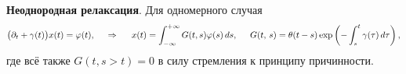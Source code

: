 \textbf{Неоднородная релаксация}. Для одномерного случая
\begin{equation*}
    \big(\partial_t + \gamma(t)\big) x(t) = \varphi(t),
    \hspace{0.5cm} \Rightarrow \hspace{0.5cm}
    x(t) = \int_{-\infty}^{+\infty}  G(t,s) \varphi(s) \, d s,
    \hspace{5 mm} 
    G(t,\,  s) = \theta(t-s) \exp\left(
        - \int_{s}^{t} \gamma(\tau) \, d \tau
    \right),
\end{equation*}
где всё также $G(t, s>t) = 0$ в силу стремления к принципу причинности. 



